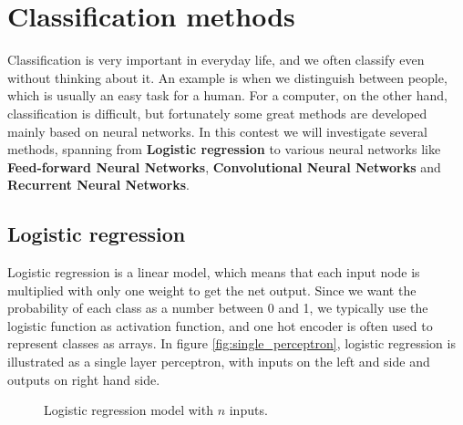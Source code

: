 \section{Classification methods} \label{sec:methods}
Classification is very important in everyday life, and we often classify even without thinking about it. An example is when we distinguish between people, which is usually an easy task for a human. For a computer, on the other hand, classification is difficult, but fortunately some great methods are developed mainly based on neural networks. In this contest we will investigate several methods, spanning from \textbf{Logistic regression} to various neural networks like \textbf{Feed-forward Neural Networks}, \textbf{Convolutional Neural Networks} and \textbf{Recurrent Neural Networks}. 

\subsection{Logistic regression}
Logistic regression is a linear model, which means that each input node is multiplied with only one weight to get the net output. Since we want the probability of each class as a number between 0 and 1, we typically use the logistic function as activation function, and one hot encoder is often used to represent classes as arrays. In figure \eqref{fig:single_perceptron}, logistic regression is illustrated as a single layer perceptron, with inputs on the left and side and outputs on right hand side. 

\begin{figure} [H]
	\centering
	\caption{Logistic regression model with $n$ inputs.}
	\label{fig:single_perceptron}
\end{figure}

